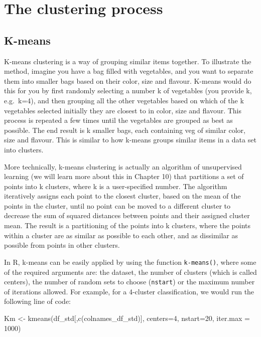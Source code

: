 \documentclass[
  letterpaper,
  DIV=11,
  numbers=noendperiod]{scrreprt}
\newenvironment{Shaded}{\begin{snugshade}}{\end{snugshade}}
\newcommand{\AttributeTok}[1]{\textcolor[rgb]{0.40,0.45,0.13}{#1}}
\newcommand{\DecValTok}[1]{\textcolor[rgb]{0.68,0.00,0.00}{#1}}
\newcommand{\FunctionTok}[1]{\textcolor[rgb]{0.28,0.35,0.67}{#1}}
\newcommand{\NormalTok}[1]{\textcolor[rgb]{0.00,0.23,0.31}{#1}}
\newcommand{\OtherTok}[1]{\textcolor[rgb]{0.00,0.23,0.31}{#1}}
\begin{document}
\hypertarget{sec-sec36}{%
\section{The clustering process}\label{sec-sec36}}

\hypertarget{k-means}{%
\subsection{K-means}\label{k-means}}

K-means clustering is a way of grouping similar items together. To
illustrate the method, imagine you have a bag filled with vegetables,
and you want to separate them into smaller bags based on their color,
size and flavour. K-means would do this for you by first randomly
selecting a number k of vegetables (you provide k, e.g.~k=4), and then
grouping all the other vegetables based on which of the k vegetables
selected initially they are closest to in color, size and flavour. This
process is repeated a few times until the vegetables are grouped as best
as possible. The end result is k smaller bags, each containing veg of
similar color, size and flavour. This is similar to how k-means groups
similar items in a data set into clusters.

More technically, k-means clustering is actually an algorithm of
unsupervised learning (we will learn more about this in Chapter 10) that
partitions a set of points into k clusters, where k is a user-specified
number. The algorithm iteratively assigns each point to the closest
cluster, based on the mean of the points in the cluster, until no point
can be moved to a different cluster to decrease the sum of squared
distances between points and their assigned cluster mean. The result is
a partitioning of the points into k clusters, where the points within a
cluster are as similar as possible to each other, and as dissimilar as
possible from points in other clusters.

In R, k-means can be easily applied by using the function
\texttt{k-means()}, where some of the required arguments are: the
dataset, the number of clusters (which is called centers), the number of
random sets to choose (\texttt{nstart}) or the maximum number of
iterations allowed. For example, for a 4-cluster classification, we
would run the following line of code:

\begin{Shaded}
\begin{Highlighting}[]
\NormalTok{Km }\OtherTok{\textless{}{-}} \FunctionTok{kmeans}\NormalTok{(df\_std[,}\FunctionTok{c}\NormalTok{(colnames\_df\_std)], }\AttributeTok{centers=}\DecValTok{4}\NormalTok{, }\AttributeTok{nstart=}\DecValTok{20}\NormalTok{, }\AttributeTok{iter.max =} \DecValTok{1000}\NormalTok{)}
\end{Highlighting}
\end{Shaded}
\end{document}
